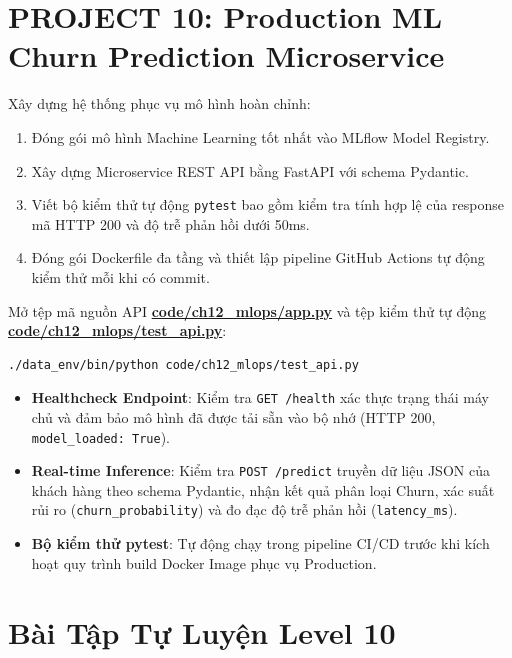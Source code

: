 \section{PROJECT 10: Production ML Churn Prediction Microservice}

Xây dựng hệ thống phục vụ mô hình hoàn chỉnh:
\begin{enumerate}
    \item Đóng gói mô hình Machine Learning tốt nhất vào MLflow Model Registry.
    \item Xây dựng Microservice REST API bằng FastAPI với schema Pydantic.
    \item Viết bộ kiểm thử tự động \texttt{pytest} bao gồm kiểm tra tính hợp lệ của response mã HTTP 200 và độ trễ phản hồi dưới 50ms.
    \item Đóng gói Dockerfile đa tầng và thiết lập pipeline GitHub Actions tự động kiểm thử mỗi khi có commit.
\end{enumerate}

\begin{handsonlabbox}
Mở tệp mã nguồn API \href{run:./code/ch12_mlops/app.py}{\textbf{code/ch12\_mlops/app.py}} và tệp kiểm thử tự động \href{run:./code/ch12_mlops/test_api.py}{\textbf{code/ch12\_mlops/test\_api.py}}:
\begin{lstlisting}[language=bash]
./data_env/bin/python code/ch12_mlops/test_api.py
\end{lstlisting}
\begin{itemize}
    \item \textbf{Healthcheck Endpoint}: Kiểm tra \texttt{GET /health} xác thực trạng thái máy chủ và đảm bảo mô hình đã được tải sẵn vào bộ nhớ (HTTP 200, \texttt{model\_loaded: True}).
    \item \textbf{Real-time Inference}: Kiểm tra \texttt{POST /predict} truyền dữ liệu JSON của khách hàng theo schema Pydantic, nhận kết quả phân loại Churn, xác suất rủi ro (\texttt{churn\_probability}) và đo đạc độ trễ phản hồi (\texttt{latency\_ms}).
    \item \textbf{Bộ kiểm thử pytest}: Tự động chạy trong pipeline CI/CD trước khi kích hoạt quy trình build Docker Image phục vụ Production.
\end{itemize}
\end{handsonlabbox}

\section{Bài Tập Tự Luyện Level 10}

